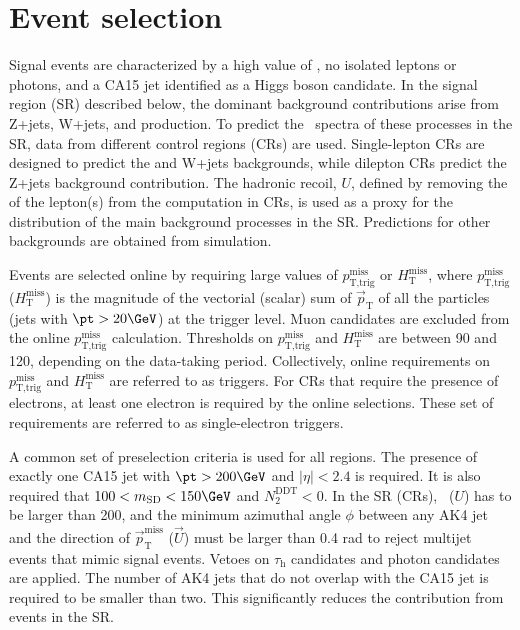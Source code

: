\section{Event selection}


Signal events are characterized by a high value of \MET, no isolated leptons or photons, and a CA15 jet identified as a Higgs boson candidate. In the signal region (SR) described
below, the dominant background contributions arise from Z+jets,
W+jets, and \ttbar production. To predict the \ptmiss~spectra of these
processes in the SR, data from different control regions (CRs) are used. Single-lepton CRs are designed to predict the \ttbar and W+jets backgrounds, while dilepton CRs predict the Z+jets background contribution. The hadronic recoil, $U$, defined by removing the \pt of the lepton(s) from the \MET computation in CRs, is used as a proxy for the \MET distribution of the main background processes in the SR. Predictions for other backgrounds are obtained from simulation.

Events are selected online by requiring large values of $p_\text{T,trig}^\text{miss}$ or $H_{\text{T}}^{\text{miss}}$, where $p_\text{T,trig}^\text{miss}$  ($H_{\text{T}}^{\text{miss}}$) is the magnitude of the vectorial (scalar) sum of $\vec{p}_\text{T}$ of all the particles (jets with $\pt>20\GeV$) at the trigger level. Muon candidates are excluded from the online $p_\text{T,trig}^\text{miss}$ calculation.
Thresholds on $p_\text{T,trig}^\text{miss}$ and $H_{\text{T}}^{\text{miss}}$ are between 90 and 120\GeV, depending on the data-taking period. Collectively, online requirements on $p_\text{T,trig}^\text{miss}$ and $H_{\text{T}}^{\text{miss}}$ are referred to as \MET triggers.
For CRs that require the presence of electrons, at least one electron is required by the online selections. These set of requirements are referred to as single-electron triggers.

A common set of preselection criteria is used for all regions. The presence of exactly one CA15 jet with $\pt>200\GeV$ and $|\eta|<2.4$ is required. It is also required that $100<m_{\text{SD}}<150\GeV$ and $N_2^{\text{DDT}}<0$. 
 In the SR (CRs), \ptmiss~($U$) has to be larger than 200\GeV, and the minimum azimuthal angle $\phi$ between any AK4 jet and the direction of $\vec{p}_{\mathrm{T}}^{\mathrm{miss}}$ ($\vec{U}$) must be larger than 0.4 rad to reject multijet events that mimic signal events. Vetoes on $\tau_\text{h}$ candidates and photon candidates are applied. The number of AK4 jets that do not overlap with the CA15 jet is required to be smaller than two. This significantly reduces the contribution from \ttbar events in the SR.

